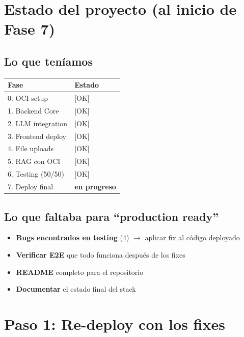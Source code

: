 \documentclass[11pt,a4paper,oneside]{article}
\newcommand{\err}{\textcolor{errred}{\textbf{\ding{55}}}}
\begin{document}
\section{Estado del proyecto (al inicio de Fase 7)}

\subsection{Lo que ten\'iamos}

\begin{center}
\begin{tabular}{ll}
\toprule
\textbf{Fase} & \textbf{Estado} \\
\midrule
0. OCI setup & [OK] \\
1. Backend Core & [OK] \\
2. LLM integration & [OK] \\
3. Frontend deploy & [OK] \\
4. File uploads & [OK] \\
5. RAG con OCI & [OK] \\
6. Testing (50/50) & [OK] \\
7. Deploy final & \textbf{en progreso} \\
\bottomrule
\end{tabular}
\end{center}

\subsection{Lo que faltaba para ``production ready''}

\begin{itemize}
  \item \err \textbf{Bugs encontrados en testing} (4) $\rightarrow$ aplicar fix al c\'odigo deployado
  \item \err \textbf{Verificar E2E} que todo funciona despu\'es de los fixes
  \item \err \textbf{README} completo para el repositorio
  \item \err \textbf{Documentar} el estado final del stack
\end{itemize}

\section{Paso 1: Re-deploy con los fixes}
\end{document}
